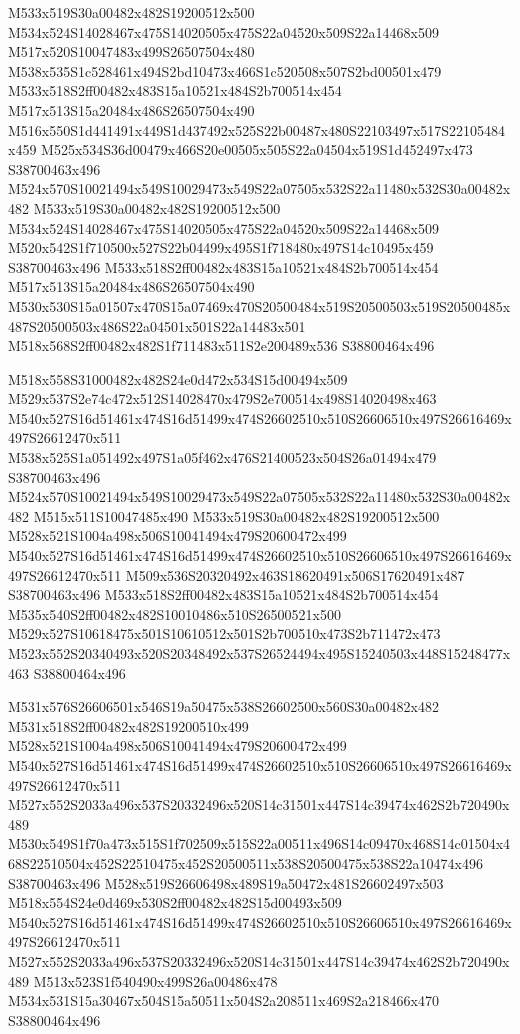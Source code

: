 \documentclass{article}
\begin{document}
\begin{multicols}{2}
M533x519S30a00482x482S19200512x500 M534x524S14028467x475S14020505x475S22a04520x509S22a14468x509 M517x520S10047483x499S26507504x480 M538x535S1c528461x494S2bd10473x466S1c520508x507S2bd00501x479 M533x518S2ff00482x483S15a10521x484S2b700514x454 M517x513S15a20484x486S26507504x490 M516x550S1d441491x449S1d437492x525S22b00487x480S22103497x517S22105484x459 M525x534S36d00479x466S20e00505x505S22a04504x519S1d452497x473 S38700463x496 M524x570S10021494x549S10029473x549S22a07505x532S22a11480x532S30a00482x482 M533x519S30a00482x482S19200512x500 M534x524S14028467x475S14020505x475S22a04520x509S22a14468x509 M520x542S1f710500x527S22b04499x495S1f718480x497S14c10495x459 S38700463x496 M533x518S2ff00482x483S15a10521x484S2b700514x454 M517x513S15a20484x486S26507504x490 M530x530S15a01507x470S15a07469x470S20500484x519S20500503x519S20500485x487S20500503x486S22a04501x501S22a14483x501 M518x568S2ff00482x482S1f711483x511S2e200489x536 S38800464x496

M518x558S31000482x482S24e0d472x534S15d00494x509 M529x537S2e74c472x512S14028470x479S2e700514x498S14020498x463 M540x527S16d51461x474S16d51499x474S26602510x510S26606510x497S26616469x497S26612470x511 M538x525S1a051492x497S1a05f462x476S21400523x504S26a01494x479 S38700463x496 M524x570S10021494x549S10029473x549S22a07505x532S22a11480x532S30a00482x482 M515x511S10047485x490 M533x519S30a00482x482S19200512x500 M528x521S1004a498x506S10041494x479S20600472x499 M540x527S16d51461x474S16d51499x474S26602510x510S26606510x497S26616469x497S26612470x511 M509x536S20320492x463S18620491x506S17620491x487 S38700463x496 M533x518S2ff00482x483S15a10521x484S2b700514x454 M535x540S2ff00482x482S10010486x510S26500521x500 M529x527S10618475x501S10610512x501S2b700510x473S2b711472x473 M523x552S20340493x520S20348492x537S26524494x495S15240503x448S15248477x463 S38800464x496

M531x576S26606501x546S19a50475x538S26602500x560S30a00482x482 M531x518S2ff00482x482S19200510x499 M528x521S1004a498x506S10041494x479S20600472x499 M540x527S16d51461x474S16d51499x474S26602510x510S26606510x497S26616469x497S26612470x511 M527x552S2033a496x537S20332496x520S14c31501x447S14c39474x462S2b720490x489 M530x549S1f70a473x515S1f702509x515S22a00511x496S14c09470x468S14c01504x468S22510504x452S22510475x452S20500511x538S20500475x538S22a10474x496 S38700463x496 M528x519S26606498x489S19a50472x481S26602497x503 M518x554S24e0d469x530S2ff00482x482S15d00493x509 M540x527S16d51461x474S16d51499x474S26602510x510S26606510x497S26616469x497S26612470x511 M527x552S2033a496x537S20332496x520S14c31501x447S14c39474x462S2b720490x489 M513x523S1f540490x499S26a00486x478 M534x531S15a30467x504S15a50511x504S2a208511x469S2a218466x470 S38800464x496


\end{multicols}
\end{document}
